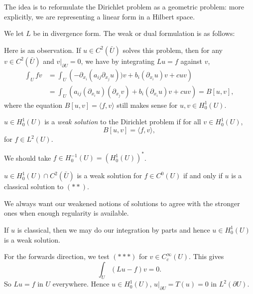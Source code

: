 \documentclass[12pt]{article}
\begin{document}
The idea is to reformulate the Dirichlet problem as a geometric problem: more explicitly, we are representing a linear form in a Hilbert space.

We let $L$ be in divergence form. The weak or dual formulation is as follows:

Here is an observation. If $u \in C^2(\bar U)$ solves this problem, then for any $v \in C^2(\bar U)$ and $v|_{\partial U} = 0$, we have by integrating $Lu=  f$ against $v$,
\begin{align*}
	\int_U f v &= \int_U \left(- \partial_{x_i} (a_{ij} \partial_{x_j} u)) v + b_i (\partial_{x_i} u) v + c uv \right) \\
		   &= \int_U \left( a_{ij} (\partial_{x_i} u) (\partial_{x_j} v) + b_i (\partial_{x_i} u) v + c u v \right) = B[u, v],
\end{align*}
where the equation $B[u, v] = \langle f, v\rangle$ still makes sense for $u, v \in H^1_0(U)$.

\begin{definition}
	$u \in H^1_0(U)$ is a \emph{weak solution} to the Dirichlet problem if for all $v \in H^1_0(U)$,
	\[
		B[u, v] = \langle f, v\rangle,
	\]
	for $f \in L^2(U)$.
\end{definition}

\begin{remark}
	We should take $f \in H^{-1}_0(U) = (H^1_0(U))^{\ast}$.
\end{remark}

\begin{proposition}
	$u \in H^1_0(U) \cap C^2(\bar U)$ is a weak solution for $f \in C^0(U)$ if and only if $u$ is a classical solution to $(\ast\ast)$.
\end{proposition}

\begin{remark}
	We always want our weakened notions of solutions to agree with the stronger ones when enough regularity is available.
\end{remark}

\begin{proofbox}
	If $u$ is classical, then we may do our integration by parts and hence $u \in H^1_0(U)$ is a weak solution.

	For the forwards direction, we test $(\ast\ast\ast)$ for $v \in C^\infty_c(U)$. This gives
	\[
	\int_U(Lu - f)v = 0.
	\]
	So $Lu = f$ in $U$ everywhere. Hence $u \in H^1_0(U)$, $u|_{\partial U} = T(u) = 0$ in $L^2(\partial U)$.
\end{proofbox}
\end{document}
